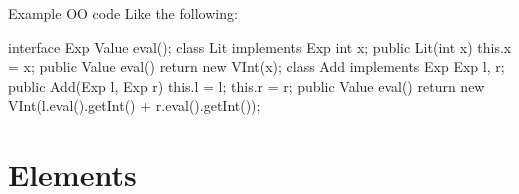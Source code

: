 \documentclass[10pt, compress]{beamer}
\newenvironment{slide}[1]{\begin{frame}[fragile,environment=slide]{#1}}{\end{frame}}
\newenvironment{slide}[2]{\begin{frame}[fragile,environment=slide]{#1}{#2}}{\end{frame}}
\begin{document}
\begin{slide}{Example OO code}
Like the following:
\begin{java}
interface Exp {
    Value eval();
}
class Lit implements Exp {
    int x;
    public Lit(int x) { this.x = x; }
    public Value eval() {
        return new VInt(x);
}}
class Add implements Exp {
    Exp l, r;
    public Add(Exp l, Exp r) { this.l = l; this.r = r; }
    public Value eval() {
        return new VInt(l.eval().getInt() + r.eval().getInt());
}}
\end{java}
\end{slide}

\section{Elements}
\end{document}
